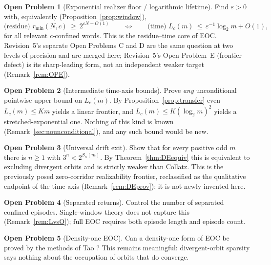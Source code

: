\documentclass[11pt]{article}
\theoremstyle{plain}
\theoremstyle{definition}
\newtheorem{openproblem}{Open Problem}
\theoremstyle{remark}
\newcommand{\rmin}{r_{\min}}
\begin{document}
\begin{openproblem}[Exponential realizer floor / logarithmic lifetime]\label{op:C}
Find $\varepsilon>0$ with, equivalently (Proposition~\ref{prop:window}),
\[
\text{(residue) } \rmin(N,c)\ \ge\ 2^{\varepsilon N-O(1)}
\qquad\Longleftrightarrow\qquad
\text{(time) } L_c(m)\ \le\ \varepsilon^{-1}\log_2 m+O(1),
\]
for all relevant $c$-confined words. This is the residue--time core of EOC. Revision~5's separate
Open Problems C and D are the same question at two levels of precision and are merged here;
Revision~5's Open Problem~E (frontier defect) is its sharp-leading form, not an independent weaker
target (Remark~\ref{rem:OPE}).
\end{openproblem}

\begin{openproblem}[Intermediate time-axis bounds]\label{op:intermediate}
Prove \emph{any} unconditional pointwise upper bound on $L_c(m)$. By
Proposition~\ref{prop:transfer} even $L_c(m)\le Km$ yields a linear frontier, and
$L_c(m)\le K(\log_2 m)^2$ yields a stretched-exponential one. Nothing of this kind is known
(Remark~\ref{sec:nounconditional}), and any such bound would be new.
\end{openproblem}

\begin{openproblem}[Universal drift exit]\label{op:DE}
Show that for every positive odd $m$ there is $n\ge1$ with $3^n<2^{S_n(m)}$. By
Theorem~\ref{thm:DEequiv} this is equivalent to excluding divergent orbits and is strictly weaker
than Collatz. This is the previously posed zero-corridor realizability frontier, reclassified as
the qualitative endpoint of the time axis (Remark~\ref{rem:DEprov}); it is not newly invented here.
\end{openproblem}

\begin{openproblem}[Separated returns]\label{op:F}
Control the number of separated confined episodes. Single-window theory does not capture this
(Remark~\ref{rem:LvsO}); full EOC requires both episode length and episode count.
\end{openproblem}

\begin{openproblem}[Density-one EOC]\label{op:G}
Can a density-one form of EOC be proved by the methods of Tao \cite{Tao}? This remains meaningful:
divergent-orbit sparsity says nothing about the occupation of orbits that do converge.
\end{openproblem}
\end{document}
